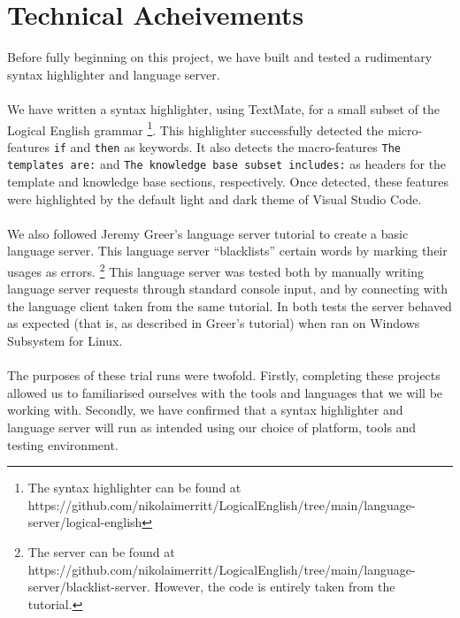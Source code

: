 \documentclass[../main.tex]{subfiles}
\begin{document}
\section*{Technical Acheivements}

Before fully beginning on this project, we have built and tested a rudimentary syntax highlighter and language server. 
\\ \\ 
We have written a syntax highlighter, using TextMate, for a small subset of the Logical English grammar \footnote{The syntax highlighter can be found at https://github.com/nikolaimerritt/LogicalEnglish/tree/main/language-server/logical-english}. This highlighter successfully detected the micro-features \texttt{if} and \texttt{then} as keywords. It also detects the macro-features \texttt{The templates are:} and \texttt{The knowledge base subset includes:} as headers for the template and knowledge base sections, respectively. Once detected, these features were highlighted by the default light and dark theme of Visual Studio Code. 
\\ \\ 
We also followed Jeremy Greer's language server tutorial\cite{blacklist_vscode_tutorial} to create a basic language server. This language server ``blacklists'' certain words by marking their usages as errors. \footnote{The server can be found at https://github.com/nikolaimerritt/LogicalEnglish/tree/main/language-server/blacklist-server. However, the code is entirely taken from the tutorial.} This language server was tested both by manually writing language server requests through standard console input, and by connecting with the language client taken from the same tutorial. In both tests the server behaved as expected (that is, as described in Greer's tutorial) when ran on Windows Subsystem for Linux. 
\\ \\ 
The purposes of these trial runs were twofold. Firstly, completing these projects allowed us to familiarised ourselves with the tools and languages that we will be working with. Secondly, we have confirmed that a syntax highlighter and language server will run as intended using our choice of platform, tools and testing environment. 
\end{document}
